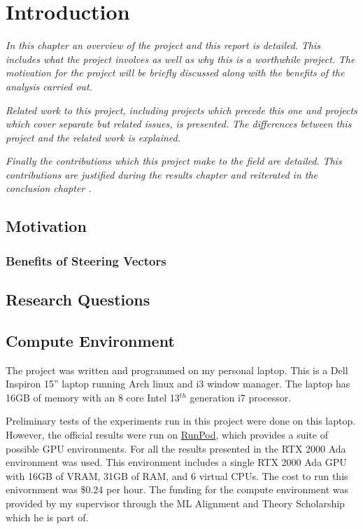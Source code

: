 \chapter{Introduction}
\label{ch:introduction}

\emph{In this chapter an overview of the project and this report is detailed.}
\emph{This includes what the project involves as well as why this is a worthwhile project.}
\emph{The motivation for the project will be briefly discussed along with the benefits of the analysis carried out.}

\emph{Related work to this project, including projects which precede this one and projects which cover separate but related issues, is presented.}
\emph{The differences between this project and the related work is explained.}

\emph{Finally the contributions which this project make to the field are detailed.}
\emph{This contributions are justified during the results chapter  and reiterated in the conclusion chapter .}

\section{Motivation}

\subsection{Benefits of Steering Vectors}

\section{Research Questions}

\section{Compute Environment}

The project was written and programmed on my personal laptop.
This is a Dell Inspiron 15'' laptop running Arch linux and i3 window manager.
The laptop has 16GB of memory with an 8 core Intel 13$^{th}$ generation i7 processor.

Preliminary tests of the experiments run in this project were done on this laptop.
However, the official results were run on \href{https://www.runpod.io/}{RunPod}, which provides a suite of possible GPU environments.
For all the results presented in  the RTX 2000 Ada environment was used.
This environment includes a single RTX 2000 Ada GPU with 16GB of VRAM, 31GB of RAM, and 6 virtual CPUs.
The cost to run this enivornment was \$0.24 per hour.
The funding for the compute environment was provided by my supervisor through the ML Alignment and Theory Scholarship \citep{mats} which he is part of.

